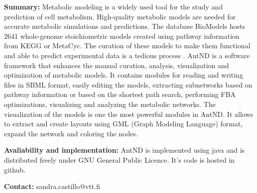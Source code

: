 
\textbf{Summary:} Metabolic modeling is a widely used tool for the study and prediction of cell metabolism. High-quality metabolic models are needed for accurate metabolic simulations and predictions. The database BioModels \cite{juty_biomodels:_2015} hosts 2641 whole-genome stoichiometric models created using pathway information from KEGG or MetaCyc. The curation of these models to make them functional and able to predict experimental data is a tedious process \cite{thiele_protocol_2010}. AntND is a software framework that enhances the manual curation, analysis, visualization and optimization of metabolic models. It contains modules for reading and writing files in SBML format, easily editing the models, extracting subnetworks based on pathway information or based on the shortest path search, performing FBA optimizations, visualizing and analyzing the metabolic networks. The visualization of the models is one the most powerful modules in AntND. It allows to extract and create layouts using GML (Graph Modeling Language) format, expand the network and coloring the nodes.

\textbf{Avaliability and implementation:} AntND is implemented using java and is distributed freely under GNU General Public Licence. It's code is hosted in github. 

\textbf{Contact:} sandra.castillo@vtt.fi
